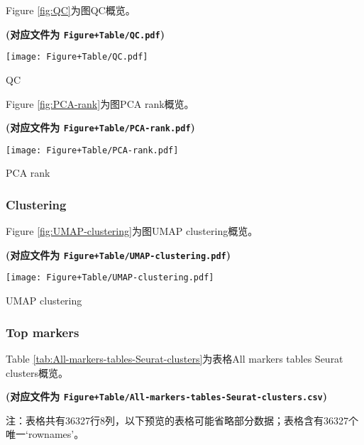 \documentclass[
]{article}
\begin{document}
Figure \ref{fig:QC}为图QC概览。

\textbf{(对应文件为 \texttt{Figure+Table/QC.pdf})}

\def\@captype{figure}
\begin{center}
\texttt{[image: Figure+Table/QC.pdf]}
\caption{QC}\label{fig:QC}
\end{center}

Figure \ref{fig:PCA-rank}为图PCA rank概览。

\textbf{(对应文件为 \texttt{Figure+Table/PCA-rank.pdf})}

\def\@captype{figure}
\begin{center}
\texttt{[image: Figure+Table/PCA-rank.pdf]}
\caption{PCA rank}\label{fig:PCA-rank}
\end{center}

\hypertarget{clustering}{%
\subsubsection{Clustering}\label{clustering}}

Figure \ref{fig:UMAP-clustering}为图UMAP clustering概览。

\textbf{(对应文件为 \texttt{Figure+Table/UMAP-clustering.pdf})}

\def\@captype{figure}
\begin{center}
\texttt{[image: Figure+Table/UMAP-clustering.pdf]}
\caption{UMAP clustering}\label{fig:UMAP-clustering}
\end{center}

\hypertarget{top-markers}{%
\subsubsection{Top markers}\label{top-markers}}

Table \ref{tab:All-markers-tables-Seurat-clusters}为表格All markers tables Seurat clusters概览。

\textbf{(对应文件为 \texttt{Figure+Table/All-markers-tables-Seurat-clusters.csv})}

\begin{center}\begin{tcolorbox}[colback=gray!10, colframe=gray!50, width=0.9\linewidth, arc=1mm, boxrule=0.5pt]注：表格共有36327行8列，以下预览的表格可能省略部分数据；表格含有36327个唯一`rownames'。
\end{tcolorbox}
\end{center}
\end{document}
